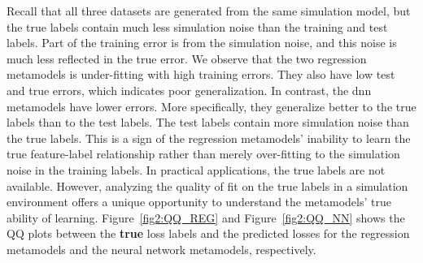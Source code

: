 Recall that all three datasets are generated from the same simulation model, but the true labels contain much less simulation noise than the training and test labels.
Part of the training error is from the simulation noise, and this noise is much less reflected in the true error.
We observe that the two regression metamodels is under-fitting with high training errors. 
They also have low test and true errors, which indicates poor generalization.
In contrast, the \gls{dnn} metamodels have lower errors.
More specifically, they generalize better to the true labels than to the test labels.
The test labels contain more simulation noise than the true labels.
This is a sign of the regression metamodels' inability to learn the true feature-label relationship rather than merely over-fitting to the simulation noise in the training labels.
In practical applications, the true labels are not available.
However, analyzing the quality of fit on the true labels in a simulation environment offers a unique opportunity to understand the metamodels' true ability of learning.
Figure~\ref{fig2:QQ_REG} and Figure~\ref{fig2:QQ_NN} shows the QQ plots between the \textbf{true} loss labels and the predicted losses for the regression metamodels and the neural network metamodels, respectively.

